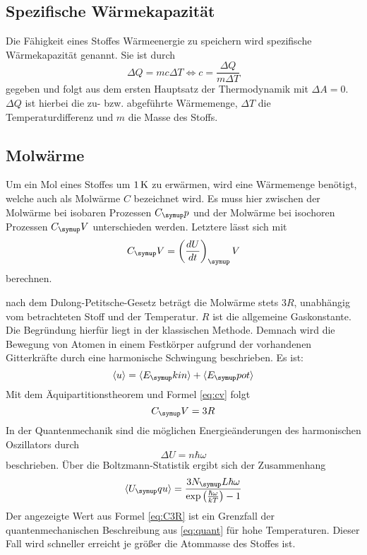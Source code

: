 \subsection{Spezifische Wärmekapazität}
Die Fähigkeit eines Stoffes Wärmeenergie zu speichern wird spezifische
Wärmekapazität genannt. Sie ist durch
\begin{equation}
  \Delta Q = mc\Delta T \Leftrightarrow c = \frac{\Delta Q}{m\Delta T}
\end{equation}
gegeben und folgt aus dem ersten Hauptsatz der Thermodynamik mit $\Delta A=0$.
$\Delta Q$ ist hierbei die zu- bzw. abgeführte Wärmemenge, $\Delta T$ die
Temperaturdifferenz und $m$ die Masse des Stoffs.
\subsection{Molwärme}
Um ein Mol eines Stoffes um $1\,\si{\kelvin}$ zu erwärmen, wird eine Wärmemenge benötigt,
welche auch als Molwärme $C$ bezeichnet wird. Es muss hier zwischen der Molwärme
bei isobaren Prozessen $C_\su{p}$ und der Molwärme bei isochoren Prozessen
$C_\su{V}$ unterschieden werden. Letztere lässt sich mit
\begin{equation}
  C_\su{V}=\left(\frac{dU}{dt}\right)_\su{V}
  \label{eq:cv}
\end{equation}
berechnen.

nach dem Dulong-Petitsche-Gesetz beträgt die Molwärme stets $3R$, unabhängig
vom betrachteten Stoff und der Temperatur. $R$ ist die allgemeine Gaskonstante.
Die Begründung hierfür liegt in der klassischen Methode. Demnach wird die
Bewegung von Atomen in einem Festkörper aufgrund der vorhandenen Gitterkräfte
durch eine harmonische Schwingung beschrieben. Es ist:
\begin{equation}
  \langle u\rangle = \langle E_\su{kin}\rangle+\langle E_\su{pot}\rangle
\end{equation}
Mit dem Äquipartitionstheorem und Formel \eqref{eq:cv} folgt
\begin{equation}
  C_\su{V}= 3R
  \label{eq:C3R}
\end{equation}
In der Quantenmechanik sind die möglichen Energieänderungen des harmonischen
Oszillators durch
\begin{equation}
  \Delta U =n\hbar\omega
\end{equation}
beschrieben. Über die Boltzmann-Statistik ergibt sich der Zusammenhang
\begin{equation}
  \langle U_\su{qu}\rangle = \frac{3N_\su{L}\hbar\omega}{\exp{\left(\frac{\hbar
  \omega}{kT}\right)}-1}
  \label{eq:quant}
\end{equation}
Der angezeigte Wert aus Formel \eqref{eq:C3R} ist ein Grenzfall der
quantenmechanischen Beschreibung aus \eqref{eq:quant} für hohe Temperaturen.
Dieser Fall wird schneller erreicht je größer die Atommasse des Stoffes ist.
